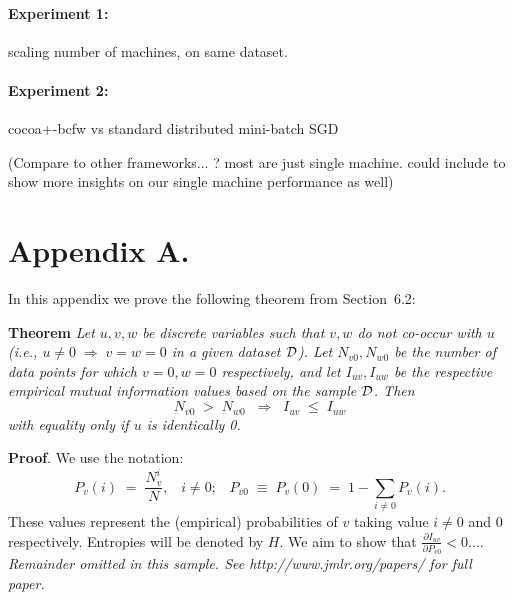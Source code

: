 \documentclass[twoside,11pt]{article}
\newcommand{\dataset}{{\cal D}}
\newcommand{\fracpartial}[2]{\frac{\partial #1}{\partial  #2}}
\newcommand{\0}{\mathbf{0}} %
\begin{document}
\paragraph{Experiment 1:} 
scaling number of machines, on same dataset.

\paragraph{Experiment 2:}
cocoa+-bcfw vs standard distributed mini-batch SGD


(Compare to other frameworks... ? most are just single machine. could include to show more insights on our single machine performance as well)





\newpage

\appendix
\section*{Appendix A.}
\label{app:theorem}



In this appendix we prove the following theorem from
Section~6.2:

\noindent
{\bf Theorem} {\it Let $u,v,w$ be discrete variables such that $v, w$ do
not co-occur with $u$ (i.e., $u\neq0\;\Rightarrow \;v=w=0$ in a given
dataset $\dataset$). Let $N_{v0},N_{w0}$ be the number of data points for
which $v=0, w=0$ respectively, and let $I_{uv},I_{uw}$ be the
respective empirical mutual information values based on the sample
$\dataset$. Then
\[
	N_{v0} \;>\; N_{w0}\;\;\Rightarrow\;\;I_{uv} \;\leq\;I_{uw}
\]
with equality only if $u$ is identically 0.} \hfill\BlackBox

\noindent
{\bf Proof}. We use the notation:
\[
P_v(i) \;=\;\frac{N_v^i}{N},\;\;\;i \neq 0;\;\;\;
P_{v0}\;\equiv\;P_v(0)\; = \;1 - \sum_{i\neq 0}P_v(i).
\]
These values represent the (empirical) probabilities of $v$
taking value $i\neq 0$ and 0 respectively.  Entropies will be denoted
by $H$. We aim to show that $\fracpartial{I_{uv}}{P_{v0}} < 0$....\\

{\noindent \em Remainder omitted in this sample. See http://www.jmlr.org/papers/ for full paper.}


\vskip 0.2in

\end{document}
